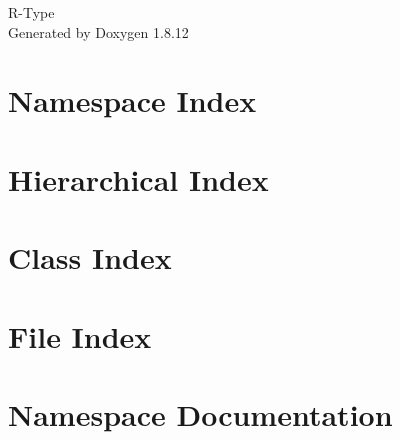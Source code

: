 \documentclass[twoside]{book}
\newcommand{\+}{\discretionary{\mbox{\scriptsize$\hookleftarrow$}}{}{}}
\newcommand{\clearemptydoublepage}{%
  \newpage{\pagestyle{empty}\cleardoublepage}%
}
\begin{document}
\begin{titlepage}
\vspace*{7cm}
\begin{center}%
{\Large R-\/\+Type }\\
\vspace*{1cm}
{\large Generated by Doxygen 1.8.12}\\
\end{center}
\end{titlepage}
\clearemptydoublepage
{}
\tableofcontents
\clearemptydoublepage
{}

\chapter{Namespace Index}

\chapter{Hierarchical Index}

\chapter{Class Index}

\chapter{File Index}

\chapter{Namespace Documentation}





\end{document}
